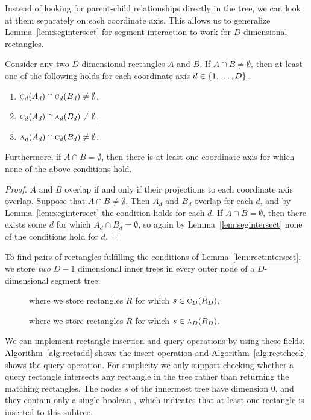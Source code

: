 \documentclass[english,gradu]{tktltiki2018}
\begin{document}
Instead of looking for parent-child relationships directly in the tree, we can look at them separately on each coordinate axis.
This allows us to generalize Lemma~\ref{lem:segintersect} for segment interaction to work for $D$-dimensional rectangles.

\begin{lem}\label{lem:rectintersect}Consider any two $D$-dimensional rectangles $A$ and $B$.
If $A\cap B\neq\emptyset$, then at least one of the following holds for each coordinate axis $d\in\set{1,\dots,D}$.
\begin{enumerate}
\item $\canoni{A_d}{d}\cap\canoni{B_d}{d}\neq\emptyset$,
\item $\canoni{A_d}{d}\cap\canonpari{B_d}{d}\neq\emptyset$,
\item $\canonpari{A_d}{d}\cap\canoni{B_d}{d}\neq\emptyset$.
\end{enumerate}
Furthermore, if $A\cap B=\emptyset$, then there is at least one coordinate axis for which none of the above conditions hold.
\end{lem}
\begin{proof}
$A$ and $B$ overlap if and only if their projections to each coordinate axis overlap.
Suppose that $A\cap B\neq\emptyset$.
Then $A_d$ and $B_d$ overlap for each $d$, and by Lemma~\ref{lem:segintersect} the condition holds for each $d$.
If $A\cap B=\emptyset$, then there exists some $d$ for which $A_d\cap B_d=\emptyset$, so again by Lemma~\ref{lem:segintersect} none of the conditions hold for $d$.
\end{proof}

To find pairs of rectangles fulfilling the conditions of Lemma~\ref{lem:rectintersect}, we store \emph{two} $D-1$ dimensional inner trees in every outer node of a $D$-dimensional segment tree:
\begin{description}
\item[] where we store rectangles $R$ for which $s\in\canoni{R_D}{D}$,
\item[] where we store rectangles $R$ for which $s\in\canonpari{R_D}{D}$.
\end{description}

We can implement rectangle insertion and query operations by using these fields.
Algorithm~\ref{alg:rectadd} shows the insert operation and Algorithm~\ref{alg:rectcheck} shows the query operation.
For simplicity we only support checking whether a query rectangle intersects any rectangle in the tree rather than returning the matching rectangles.
The nodes $s$ of the innermost tree have dimension 0, and they contain only a single boolean , which indicates that at least one rectangle is inserted to this subtree.
\end{document}
